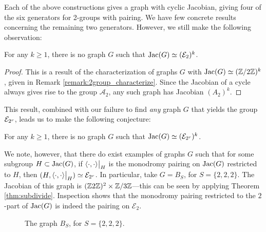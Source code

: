 \documentclass{amsart}
\begin{document}
Each of the above constructions gives a graph with cyclic Jacobian,
giving four of the six generators for 2-groups with pairing. We have
few concrete results concerning the remaining two generators. However,
we still make the following observation:

\begin{thm}
  For any $k \ge 1$, there is no graph $G$ such that $\operatorname{Jac}(G) \simeq
  (\mathcal{E}_2)^k$. 
\end{thm}
\begin{proof}
  This is a result of the characterization of graphs $G$ with $\operatorname{Jac}(G)
  \simeq (\mathbb{Z}/2\mathbb{Z})^k$, given in Remark
  \ref{remark:2group_characterize}. Since the Jacobian of a cycle
  always gives rise to the group $\mathcal{A}_2$, any such graph has
  Jacobian $({A}_2)^k$.
\end{proof}

This result, combined with our failure to find \emph{any} graph $G$
that yields the group $\mathcal{E}_{2^{r}}$, leads us to make the following conjecture:

\begin{conj}
  For any $k \ge 1$, there is no graph $G$ such that $\operatorname{Jac}(G) \simeq
  (\mathcal{E}_{2^{r}})^k$.
\end{conj}

We note, however, that there do exist examples of graphs $G$ such that
for some subgroup $H \subset \operatorname{Jac}(G)$, if $\langle \cdot, \cdot \rangle\big|_H$
is the monodromy pairing on $\operatorname{Jac}(G)$ restricted to $H$, then $(H,
\langle \cdot, \cdot \rangle\big|_H) \simeq \mathcal{E}_{2^{r}}$. In particular, take $G =
B_S$, for $S = \{2, 2, 2\}$. The Jacobian of this graph is $(\mathbb{Z}2\mathbb{Z})^2
\times \mathbb{Z}/3\mathbb{Z}$---this can be seen by applying Theorem
\ref{thm:subdivide}. Inspection shows that the monodromy pairing
restricted to the $2$-part of $\operatorname{Jac}(G)$ is indeed the pairing on
$\mathcal{E}_2$.

\begin{figure}[H]
  \begin{center}
  \end{center}
  \caption{The graph $B_S$, for $S = \{2,2,2\}$.}
\end{figure}
\end{document}
